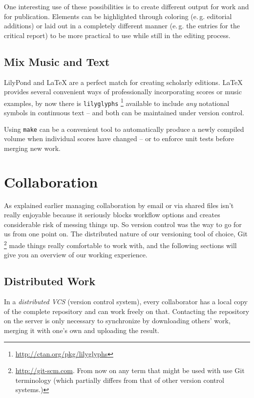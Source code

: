 \documentclass[11pt,a4paper]{article}
\begin{document}
One interesting use of these possibilities is to create different output for work and for
publication. Elements can be highlighted through coloring (e.\,g. editorial additions)
or laid out in a completely different manner (e.\,g. the entries for the critical report) to 
be more practical to use while still in the editing process.

\subsection{Mix Music and Text}
LilyPond and \LaTeX{} are a perfect match for creating scholarly editions. \LaTeX{}
provides several convenient ways of professionally incorporating scores or music examples,
by now there is \texttt{lilyglyphs}%
\footnote{\url{http://ctan.org/pkg/lilyglyphs}}
available to include \emph{any} notational symbols in continuous text -- and both
can be maintained under version control.

Using \texttt{make} can be a convenient tool to automatically produce a newly compiled
volume when individual scores have changed -- or to enforce unit tests before merging
new work.

\section{Collaboration}\label{sec:collaboration}
As explained earlier managing collaboration by email or via shared files isn't really
enjoyable because it seriously blocks workflow options and creates considerable risk
of messing things up. So version control was the way to go for us from one point on.
The distributed nature of our versioning tool of choice, Git%
\footnote{\url{http://git-scm.com}. From now on any term that might be used with use
Git terminology (which partially differs from that of other version control systems.)}
made things really comfortable to work with, and the following sections will give you
an overview of our working experience.

\subsection{Distributed Work}
In a \textsl{distributed VCS} (version control system), every collaborator
has a local copy of the complete repository and can work freely on that.
Contacting the repository on the server is only necessary to synchronize by downloading
others' work, merging it with one's own and uploading the result.
\end{document}
